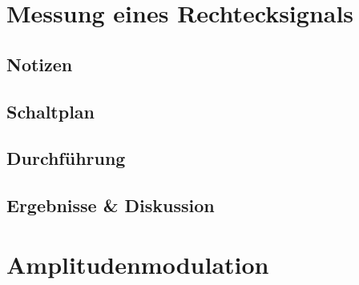 \documentclass[12pt,a4paper,titlepage]{article}
\begin{document}
\section{Messung eines Rechtecksignals}

\subsection*{Notizen}

\subsection*{Schaltplan}

\subsection*{Durchf\"uhrung}

\subsection*{Ergebnisse \& Diskussion}

\section{Amplitudenmodulation}
\end{document}
